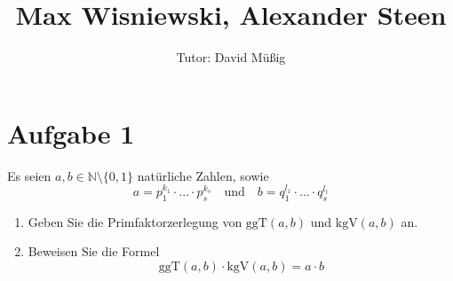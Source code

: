 \documentclass[11pt,a4paper,ngerman]{article}
\author{Tutor: David Müßig}
\date{}
\title{Max Wisniewski, Alexander Steen}
\newcommand{\N}{\mathbb{N}}
\newcommand{\ggT}{\text{ggT}}
\newcommand{\kgV}{\text{kgV}}
\begin{document}

\maketitle
\thispagestyle{fancy}


\section*{Aufgabe 1}

Es seien $a,b \in \N \setminus \{ 0,1 \}$ natürliche Zahlen, sowie
$$
a= p_1^{k_1}\cdot ...\cdot p_s^{k_s} \quad \text{und} \quad b = q_1^{l_1} \cdot ... \cdot q_s^{l_t}
$$
\begin{enumerate}[\bfseries a)]
\item Geben Sie die Primfaktorzerlegung von $\ggT (a,b)$ und $\kgV (a,b)$ an.\\

\item Beweisen Sie die Formel
$$ \ggT (a,b) \cdot \kgV (a,b) = a \cdot b $$

\end{enumerate}

\end{document}
